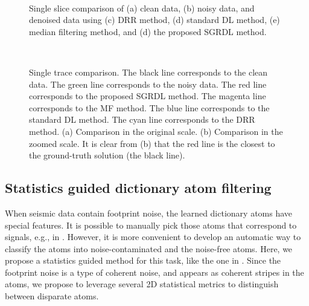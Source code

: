 \begin{figure}[htb!]
\centering
{}
\\
\caption{Single slice comparison of (a) clean data, (b) noisy data, and denoised data using (c) DRR method, (d) standard DL method, (e) median filtering method, and (d) the proposed SGRDL method. }
\label{fig:syn-c-t,syn-n-t,syn-drr-t,syn-dl-t,syn-mf-t,syn-sgrdl-t}
\end{figure}

\begin{figure}[htb!]
\centering
{}\\
\caption{Single trace comparison. The black line corresponds to the clean data. The green line corresponds to the noisy data. The red line corresponds to the proposed SGRDL method. The magenta line corresponds to the MF method. The blue line corresponds to the standard DL method. The cyan line corresponds to the DRR method. (a) Comparison in the original scale. (b) Comparison in the zoomed scale. It is clear from (b) that the red line is the closest to the ground-truth solution (the black line). }
\label{fig:syn-ss-0,syn-ss-z}
\end{figure}

\subsection{Statistics guided dictionary atom filtering}
When seismic data contain footprint noise, the learned dictionary atoms have special features. It is possible to manually pick those atoms that correspond to signals, e.g., in \cite{liu2020deep}. However, it is more convenient to develop an automatic way to classify the atoms into noise-contaminated and the noise-free atoms.  Here, we propose a statistics guided method for this task, like the one in \cite{yatong2021}. Since the footprint noise is a type of coherent noise, and appears as coherent stripes in the atoms, we propose to leverage several 2D statistical metrics to distinguish between disparate atoms. 


